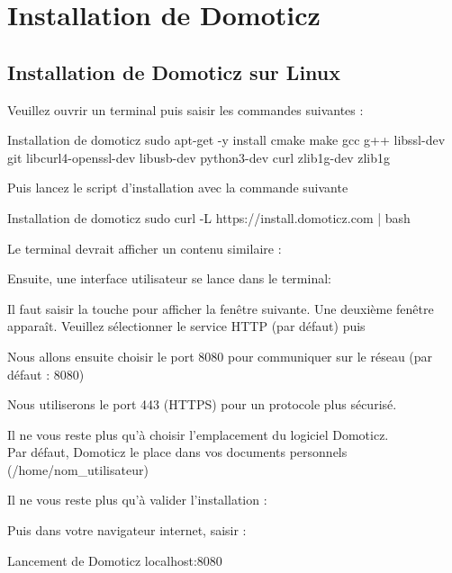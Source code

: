 \chapter{Installation de Domoticz}
\section{Installation de Domoticz sur Linux}

Veuillez ouvrir un terminal puis saisir les commandes suivantes : 

\begin{Bash}{Installation de domoticz}
sudo apt-get -y install cmake make gcc g++ libssl-dev git libcurl4-openssl-dev libusb-dev python3-dev curl zlib1g-dev zlib1g
\end{Bash}

Puis lancez le script d'installation avec la commande suivante

\begin{Bash}{Installation de domoticz}
  sudo curl -L https://install.domoticz.com | bash
\end{Bash}

Le terminal devrait afficher un contenu similaire : 


Ensuite, une interface utilisateur se lance dans le terminal:



Il faut saisir la touche  pour afficher la fenêtre suivante.
Une deuxième fenêtre apparaît. Veuillez sélectionner le service HTTP (par défaut) puis 


Nous allons ensuite choisir le port 8080 pour communiquer sur le réseau (par défaut : 8080)


Nous utiliserons le port 443 (HTTPS) pour un protocole plus sécurisé.


Il ne vous reste plus qu'à choisir l'emplacement du logiciel Domoticz.\\
Par défaut, Domoticz le place dans vos documents personnels (/home/nom\_utilisateur)


Il ne vous reste plus qu'à valider l'installation : 


Puis dans votre navigateur internet, saisir :

\begin{Bash}{Lancement de Domoticz}
  localhost:8080
\end{Bash}





